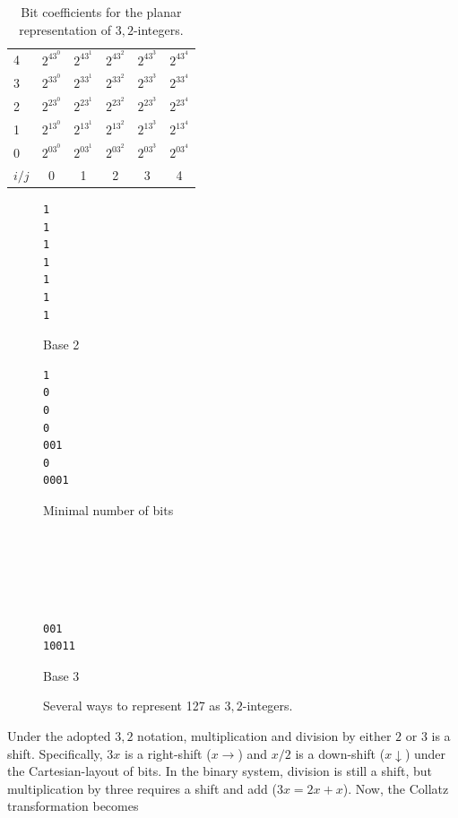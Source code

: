 \documentclass{article}
\begin{document}
\begin{table}
  \begin{center}
  \begin{tabular}{lccccc}
  4 & $2^43^0$ & $2^43^1$& $2^43^2$& $2^43^3$& $2^43^4$ \\
  3 & $2^33^0$ & $2^33^1$& $2^33^2$& $2^33^3$& $2^33^4$ \\
  2 & $2^23^0$ & $2^23^1$& $2^23^2$& $2^23^3$& $2^23^4$ \\
  1 & $2^13^0$ & $2^13^1$& $2^13^2$& $2^13^3$& $2^13^4$ \\
  0 & $2^03^0$ & $2^03^1$& $2^03^2$& $2^03^3$& $2^03^4$ \\
  $i/j$ & 0 & 1 & 2 & 3 & 4
  \end{tabular}
  \end{center}
  \caption{
    Bit coefficients for the planar representation of ${3,2}$-integers.}
  \label{tbl:pvs}
\end{table}

\begin{figure}
  \begin{multicols}{3}
\begin{verbatim}
1
1
1
1
1
1
1
\end{verbatim}
Base 2
\columnbreak
\begin{verbatim}
1
0
0
0
001
0
0001
\end{verbatim}
Minimal number of bits
\columnbreak
\begin{verbatim}





001
10011
\end{verbatim}
Base 3
  \end{multicols}

  \caption{Several ways to represent 127 as ${3,2}$-integers.}
  \label{fig:127}
\end{figure}

Under the adopted ${3,2}$ notation, multiplication and division by either $2$
or $3$ is a shift. Specifically, $3x$ is a right-shift ($x\rightarrow$) and
$x/2$ is a down-shift ($x\downarrow$) under the Cartesian-layout of bits. In
the binary system, division is still a shift, but multiplication by three
requires a shift and add ($3x=2x+x$). Now, the Collatz transformation becomes
\end{document}
